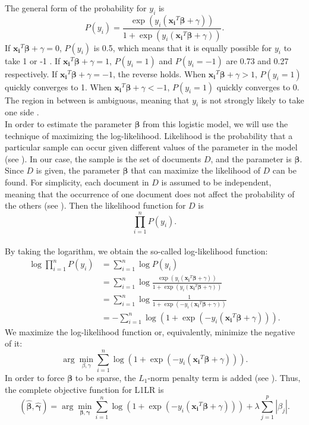 \documentclass{article}
\begin{document}
The general form of the probability for $y_i$ is
\begin{equation}
 P(y_i)=\frac{\exp(y_i(\boldsymbol{x_i}^T\boldsymbol{\beta}+\gamma))}{1+\exp(y_i(\boldsymbol{x_i}^T\boldsymbol{\beta}+\gamma))}.
\end{equation}
If $\boldsymbol{x_i}^T\boldsymbol{\beta}+\gamma=0$, $P(y_i)$ is 0.5, which means that it is equally possible for $y_i$ to take 1 or -1 . If $\boldsymbol{x_i}^T\boldsymbol{\beta}+\gamma=1$, $P(y_i=1)$ and $P(y_i=-1)$ are 0.73 and 0.27 respectively. If $\boldsymbol{x_i}^T\boldsymbol{\beta}+\gamma=-1$, the reverse holds. When $\boldsymbol{x_i}^T\boldsymbol{\beta}+\gamma>1$, $P(y_i=1)$ quickly converges to 1. When $\boldsymbol{x_i}^T\boldsymbol{\beta}+\gamma<-1$, $P(y_i=1)$ quickly converges to 0. The region in between is ambiguous, meaning that $y_i$ is not strongly likely to take one side \cite{l1lr}. \\
In order to estimate the parameter $\boldsymbol{\beta}$ from this logistic model, we will use the technique of maximizing the log-likelihood. Likelihood is the probability that a particular sample can occur given different values of the parameter in the model (see \cite{Roussas}). In our case, the sample is the set of documents $D$, and the parameter is $\boldsymbol{\beta}$. Since $D$ is given, the parameter $\boldsymbol{\beta}$ that can maximize the likelihood of $D$ can be found. For simplicity, each document in $D$ is assumed to be independent, meaning that the occurrence of one document does not affect the probability of the others (see \cite{Roussas}). Then the likelihood function for $D$ is\\
$$\prod_{i=1}^n P(y_i).$$ \\
By taking the logarithm, we obtain the so-called log-likelihood function:\\
\begin{align*}
\log\prod_{i=1}^n P(y_i)&=\sum_{i=1}^n \log P(y_i)\\
&=\sum_{i=1}^n \log \frac{\exp(y_i(\boldsymbol{x_i}^T\boldsymbol{\beta}+\gamma))}{1+\exp(y_i(\boldsymbol{x_i}^T\boldsymbol{\beta}+\gamma))}\\
&=\sum_{i=1}^n \log \frac{1}{1+\exp(-y_i(\boldsymbol{x_i}^T\boldsymbol{\beta}+\gamma))}\\
&=-\sum_{i=1}^n \log(1+\exp(-y_i(\boldsymbol{x_i}^T\boldsymbol{\beta}+\gamma))).
\end{align*}
We maximize the log-likelihood function or, equivalently, minimize the negative of it:
$$\arg \min_{\beta,\gamma} \sum_{i=1}^n \log(1+\exp(-y_i(\boldsymbol{x_i}^T\boldsymbol{\beta}+\gamma))).$$
In order to force $\boldsymbol{\beta}$ to be sparse, the $L_1$-norm penalty term is added (see \cite{elghaoui_1}). Thus,  the complete objective function for L1LR is\\
\begin{equation}\label{asfa}
(\hat{\boldsymbol{\beta}}, \hat{\boldsymbol{\gamma}})=\arg \min_{\boldsymbol{\beta},\boldsymbol{\gamma}} \sum_{i=1}^n \log(1+\exp(-y_i(\boldsymbol{x_i}^T\boldsymbol{\beta}+\gamma)))+\lambda \sum^p_{j=1} |\beta_j|.
\end{equation}
\end{document}
